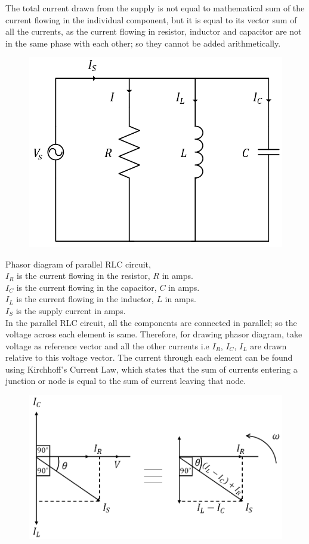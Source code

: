 \documentclass[../main.tex]{subfiles}
\begin{document}
The total current drawn from the supply is not equal to mathematical sum of the current flowing in the individual component, but it is equal to its vector sum of all the currents, as the current flowing in resistor, inductor and capacitor are not in the same phase with each other; so they cannot be added arithmetically.
\begin{figure}[ht]
    \centering
    \includegraphics[scale=1]{circuit-2.png}
\end{figure}
Phasor diagram of parallel RLC circuit,\\
$ I_R $ is the current flowing in the resistor, $ R $ in amps.\\
$ I_C $ is the current flowing in the capacitor, $ C $ in amps.\\
$ I_L $ is the current flowing in the inductor, $ L $ in amps.\\
$ I_S $ is the supply current in amps.\\
In the parallel RLC circuit, all the components are connected in parallel; so the voltage across each element is same. Therefore, for drawing phasor diagram, take voltage as reference vector and all the other currents i.e $ I_R $, $ I_C $, $ I_L $ are drawn relative to this voltage vector. The current through each element can be found using Kirchhoff's Current Law, which states that the sum of currents entering a junction or node is equal to the sum of current leaving that node.
\begin{figure}[ht]
    \centering
    \includegraphics[scale=1]{phasor-2.png}
\end{figure}
\end{document}
